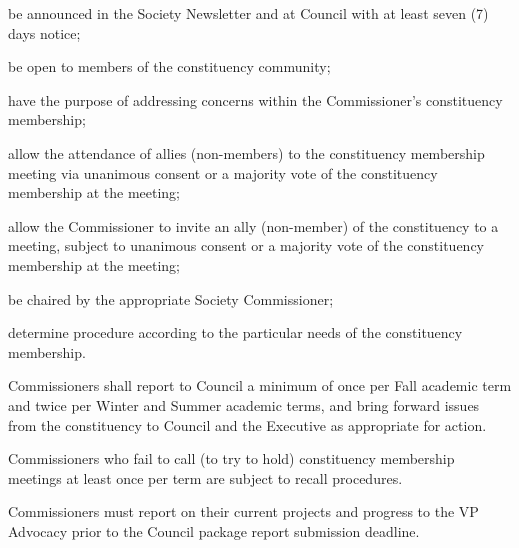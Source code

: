 \begin{longenum}[ label*=\thesubsection.\arabic*., align=left]
\begin{longenum}[ label*=\arabic*., align=left]
\item be announced in the Society Newsletter and at Council with at least seven (7) days notice;
\item be open to members of the constituency community;
\item have the purpose of addressing concerns within the Commissioner's constituency membership;
\item allow the attendance of allies (non-members) to the constituency membership meeting via unanimous consent or a majority vote of the constituency membership at the meeting;
\item allow the Commissioner to invite an ally (non-member) of the constituency to a meeting, subject to unanimous consent or a majority vote of the constituency membership at the meeting;
\item be chaired by the appropriate Society Commissioner;
\item determine procedure according to the particular needs of the constituency membership.
\end{longenum}
\item Commissioners shall report to Council a minimum of once per Fall academic term and twice per Winter and Summer academic terms, and bring forward issues from the constituency to Council and the Executive as appropriate for action.
\item Commissioners who fail to call (to try to hold) constituency membership meetings at least once per term are subject to recall procedures.
\item Commissioners must report on their current projects and progress to the VP Advocacy prior to the Council package report submission deadline.
\end{longenum}


